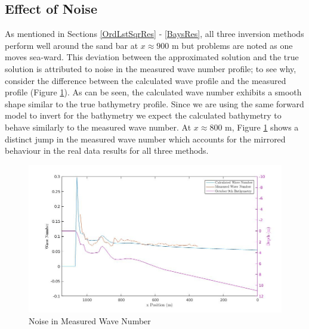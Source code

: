 \subsection{Effect of Noise}
\label{EffctOfNoise}

As mentioned in Sections \ref{OrdLstSqrRes} - \ref{BaysRes}, all three inversion methods perform well around the sand bar at $x \approx 900$ m but problems are noted as one moves sea-ward. This deviation between the approximated solution and the true solution is attributed to noise in the measured wave number profile; to see why, consider the difference between the calculated wave profile and the measured profile (Figure \ref{effectivewavenumbernoise}). As can be seen, the calculated wave number exhibits a smooth shape similar to the true bathymetry profile. Since we are using the same forward model to invert for the bathymetry we expect the calculated bathymetry to behave similarly to the measured wave number. At $x \approx 800$ m, Figure \ref{effectivewavenumbernoise} shows a distinct jump in the measured wave number which accounts for the mirrored behaviour in the real data results for all three methods.

\begin{figure}[H]
\center
\includegraphics[scale=0.46]{img/Real_vs_Calcd_wavenum.jpg} 
\caption{Noise in Measured Wave Number}
\label{effectivewavenumbernoise}
\end{figure}